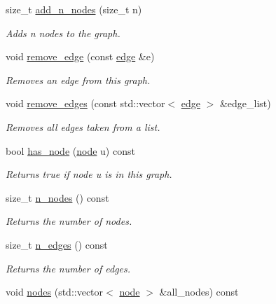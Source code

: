 \begin{DoxyCompactItemize}
size\-\_\-t \hyperlink{classlgraph_1_1xxgraph_a8dd24aa48d55dfceaa87e47c32ae914a}{add\-\_\-n\-\_\-nodes} (size\-\_\-t n)
\begin{DoxyCompactList}\small\item\em Adds {\itshape n} nodes to the graph. \end{DoxyCompactList}\item 
void \hyperlink{classlgraph_1_1xxgraph_a46a75fa2a10a8674ab930e9dc766e2f9}{remove\-\_\-edge} (const \hyperlink{namespacelgraph_a76bd7d50719f03de7a85db259d80d572}{edge} \&e)
\begin{DoxyCompactList}\small\item\em Removes an edge from this graph. \end{DoxyCompactList}\item 
void \hyperlink{classlgraph_1_1xxgraph_aef7c4bf62f3f4db362b2d3accb3b6d3d}{remove\-\_\-edges} (const std\-::vector$<$ \hyperlink{namespacelgraph_a76bd7d50719f03de7a85db259d80d572}{edge} $>$ \&edge\-\_\-list)
\begin{DoxyCompactList}\small\item\em Removes all edges taken from a list. \end{DoxyCompactList}\item 
\hypertarget{classlgraph_1_1xxgraph_ac2ff3b6ec8da7c5b61d1c84215eed680}{bool \hyperlink{classlgraph_1_1xxgraph_ac2ff3b6ec8da7c5b61d1c84215eed680}{has\-\_\-node} (\hyperlink{namespacelgraph_a397169dd66adf725210a30fb7251773e}{node} u) const }\label{classlgraph_1_1xxgraph_ac2ff3b6ec8da7c5b61d1c84215eed680}

\begin{DoxyCompactList}\small\item\em Returns true if node {\itshape u} is in this graph. \end{DoxyCompactList}\item 
size\-\_\-t \hyperlink{classlgraph_1_1xxgraph_a879c8fc141a2d7847ec4e192e3b415f5}{n\-\_\-nodes} () const 
\begin{DoxyCompactList}\small\item\em Returns the number of nodes. \end{DoxyCompactList}\item 
size\-\_\-t \hyperlink{classlgraph_1_1xxgraph_a8ca991d1521cb6ba77e1cd3494ab42be}{n\-\_\-edges} () const 
\begin{DoxyCompactList}\small\item\em Returns the number of edges. \end{DoxyCompactList}\item 
\hypertarget{classlgraph_1_1xxgraph_a27086830e76e7cf847ba0bc3c26fb0ee}{void \hyperlink{classlgraph_1_1xxgraph_a27086830e76e7cf847ba0bc3c26fb0ee}{nodes} (std\-::vector$<$ \hyperlink{namespacelgraph_a397169dd66adf725210a30fb7251773e}{node} $>$ \&all\-\_\-nodes) const }\label{classlgraph_1_1xxgraph_a27086830e76e7cf847ba0bc3c26fb0ee}


\end{DoxyCompactItemize}
